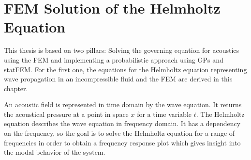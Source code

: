 \documentclass[%
  a4paper,oneside,%
  11pt,%
  smallchapters,
  style=printdev,
  extramargin,
  green,%
  rgb, <cmyk>
  ]{tubsbook}
\begin{document}
\chapter{FEM Solution of the Helmholtz Equation}
This thesis is based on two pillars: Solving the governing equation for acoustics using the FEM and implementing a probabilistic approach using GPs and statFEM. For the first one, the equations for the Helmholtz equation representing wave propagation in an incompressible fluid and the FEM are derived in this chapter.

An acoustic field is represented in time domain by the wave equation. It returns the acoustical pressure at a point in space $x$ for a time variable $t$.
The Helmholtz equation describes the wave equation in frequency domain. It has a dependency on the frequency, so the goal is to solve the Helmholtz equation for a range of frequencies in order to obtain a frequency response plot which gives insight into the modal behavior of the system.
\end{document}
